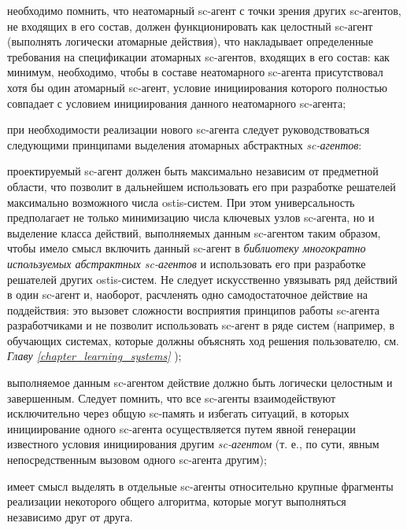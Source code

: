 \begin{textitemize}
\item необходимо помнить, что неатомарный sc-агент с точки зрения других sc-агентов, не входящих в его состав, должен функционировать как целостный sc-агент (выполнять логически атомарные действия), что накладывает определенные требования на спецификации атомарных sc-агентов, входящих в его состав: как минимум, необходимо, чтобы в составе неатомарного sc-агента присутствовал хотя бы один атомарный sc-агент, условие инициирования которого полностью совпадает с условием инициирования данного неатомарного sc-агента;
\item при необходимости реализации нового sc-агента следует руководствоваться следующими принципами выделения атомарных абстрактных \textit{sc-агентов}:

\begin{textitemize}
    \item проектируемый sc-агент должен быть максимально независим от предметной области, что позволит в дальнейшем использовать его при разработке решателей максимально возможного числа ostis-систем. При этом универсальность предполагает не только минимизацию числа ключевых узлов sc-агента, но и выделение класса действий, выполняемых данным sc-агентом таким образом, чтобы имело смысл включить данный sc-агент в \textit{библиотеку многократно используемых абстрактных sc-агентов} и использовать его при разработке решателей других ostis-систем. Не следует искусственно увязывать ряд действий в один sc-агент и, наоборот, расчленять одно самодостаточное действие на поддействия: это вызовет сложности восприятия принципов работы sc-агента разработчиками и не позволит использовать sc-агент в ряде систем (например, в обучающих системах, которые должны объяснять ход решения пользователю, см. \textit{Главу \ref{chapter_learning_systems} });
    \item выполняемое данным sc-агентом действие должно быть логически целостным и завершенным. Следует помнить, что все sc-агенты взаимодействуют исключительно через общую sc-память и избегать ситуаций, в которых инициирование одного sc-агента осуществляется путем явной генерации известного условия инициирования другим \textit{sc-агентом} (т. е., по сути, явным непосредственным вызовом одного sc-агента другим);
    \item имеет смысл выделять в отдельные sc-агенты относительно крупные фрагменты реализации некоторого общего алгоритма, которые могут выполняться независимо друг от друга.
\end{textitemize}


\end{textitemize}
